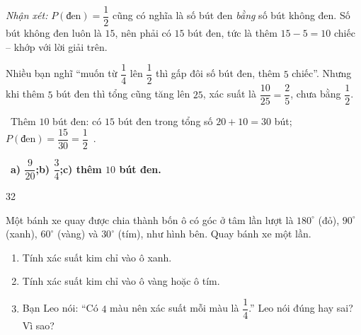 \documentclass[11pt]{article}
\providecommand{\AnsWord}{Đáp số}
\newenvironment{probbox}[2]{\begin{probboxT}{#1}{#2}}{\end{probboxT}}
\newcommand{\ans}[1]{\par\smallskip{\bfseries\color{tmGreen!88!black}\AnsWord:}\ {\bfseries\color{AnsRed}#1}\par}
\newcommand{\verify}[1]{\par\smallskip\noindent{\bfseries\color{tmGreen!80!black}\faCheckCircle\ \CheckWord}\ #1\par}
\def\AnsWord{Đáp số}
\def\CheckWord{Thử lại:}
\begin{document}
{\emph{Nhận xét:} $P(\text{đen})=\dfrac12$ cũng có nghĩa là số bút đen \emph{bằng} số bút không đen. Số bút không đen luôn là $15$, nên phải có $15$ bút đen, tức là thêm $15-5=10$ chiếc -- khớp với lời giải trên.
\begin{warnbox}Nhiều bạn nghĩ ``muốn từ $\dfrac14$ lên $\dfrac12$ thì gấp đôi số bút đen, thêm $5$ chiếc''. Nhưng khi thêm $5$ bút đen thì tổng cũng tăng lên $25$, xác suất là $\dfrac{10}{25}=\dfrac25$, chưa bằng $\dfrac12$.\end{warnbox}
\verify{Thêm $10$ bút đen: có $15$ bút đen trong tổng số $20+10=30$ bút; $P(\text{đen})=\dfrac{15}{30}=\dfrac12$~\checkmark.}
\ans{a) $\dfrac{9}{20}$;\quad b) $\dfrac34$;\quad c) thêm $10$ bút đen.}
}

\begin{probbox}{32}{\relax}
\begin{minipage}[t]{0.6\linewidth}\vspace{0pt}
Một bánh xe quay được chia thành bốn ô có góc ở tâm lần lượt là $180^\circ$ (đỏ), $90^\circ$ (xanh), $60^\circ$ (vàng) và $30^\circ$ (tím), như hình bên. Quay bánh xe một lần.
\begin{enumerate}[label=\alph*),leftmargin=1.5em,itemsep=0pt,topsep=2pt]
\item Tính xác suất kim chỉ vào ô xanh.
\item Tính xác suất kim chỉ vào ô vàng hoặc ô tím.
\item Bạn Leo nói: ``Có $4$ màu nên xác suất mỗi màu là $\dfrac14$.'' Leo nói đúng hay sai? Vì sao?
\end{enumerate}
\end{minipage}\hfill
\begin{minipage}[t]{0.36\linewidth}\vspace{0pt}
\centering{}
\end{minipage}
\end{probbox}
\end{document}
